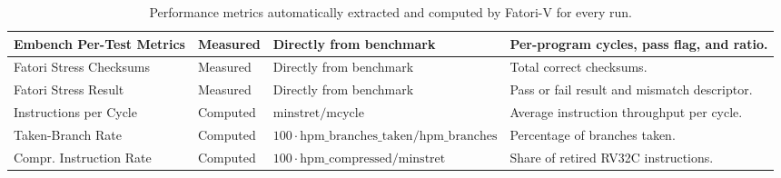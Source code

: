 \begin{table}[h]
\begin{tabularx}{\textwidth}{|p{}|p{}|X|X|}
\hline
Embench Per-Test Metrics &
Measured &
Directly from benchmark &
Per-program cycles, pass flag, and ratio. \\
\hline
Fatori Stress Checksums &
Measured &
Directly from benchmark &
Total correct checksums. \\
\hline
Fatori Stress Result &
Measured &
Directly from benchmark &
Pass or fail result and mismatch descriptor. \\
\hline
Instructions per Cycle &
Computed &
\(\mathrm{minstret}/\mathrm{mcycle}\) &
Average instruction throughput per cycle. \\
\hline
Taken-Branch Rate &
Computed &
\(100\cdot\mathrm{hpm\_branches\_taken}/\mathrm{hpm\_branches}\) &
Percentage of branches taken. \\
\hline
Compr. Instruction Rate &
Computed &
\(100\cdot\mathrm{hpm\_compressed}/\mathrm{minstret}\) &
Share of retired RV32C instructions. \\
\hline
\end{tabularx}
\caption{Performance metrics automatically extracted and computed by \ac{Fatori-V} for every run.}
\label{tab:metrics_performance}
\end{table}




